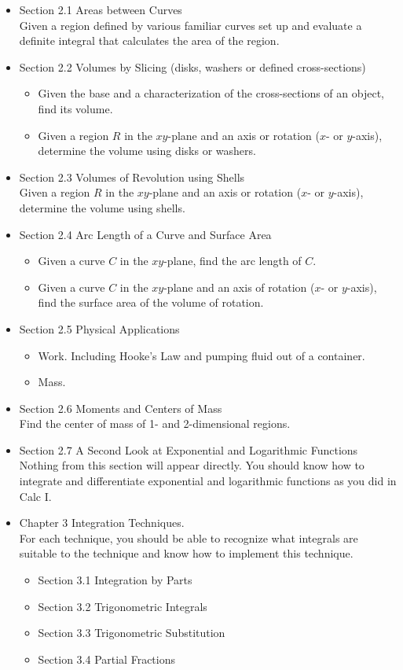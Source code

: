 \documentclass[11pt,fleqn]{article}
\begin{document}
\begin{itemize}
\item Section 2.1 Areas between Curves\\
Given a region defined by various familiar curves set up and evaluate a definite integral that calculates the area of the region.
\item Section 2.2 Volumes by Slicing (disks, washers or defined cross-sections)
	\begin{itemize}
	\item Given the base and a characterization of the cross-sections of an object, find its volume.
	\item Given a region $R$ in the $xy$-plane and an axis or rotation ($x$- or $y$-axis), determine the volume using disks or washers.
	\end{itemize}
\item Section 2.3 Volumes of Revolution using Shells\\
Given a region $R$ in the $xy$-plane and an axis or rotation ($x$- or $y$-axis), determine the volume using shells.
\item Section 2.4 Arc Length of a Curve and Surface Area
	\begin{itemize}
	\item Given a curve $C$ in the $xy$-plane, find the arc length of $C$. 
	\item Given a curve $C$ in the $xy$-plane and an axis of rotation ($x$- or $y$-axis), find the surface area of the volume of rotation.
	\end{itemize}
\item Section 2.5 Physical Applications
	\begin{itemize}
	\item Work. Including Hooke's Law and pumping fluid out of a container.
	\item Mass.
	\end{itemize}
\item Section 2.6 Moments and Centers of Mass\\
Find the center of mass of 1- and 2-dimensional regions.
\item Section 2.7 A Second Look at Exponential and Logarithmic Functions\\
Nothing from this section will appear directly. You should know how to integrate and differentiate exponential and logarithmic functions as you did in Calc I.

\newpage

\item Chapter 3 Integration Techniques.\\
For each technique, you should be able to recognize what integrals are suitable to the technique and know how to implement this technique.
	\begin{itemize}
	\item Section 3.1 Integration by Parts
	\item Section 3.2 Trigonometric Integrals
	\item Section 3.3 Trigonometric Substitution
	\item Section 3.4 Partial Fractions
	\end{itemize}
\end{itemize}
\end{document}
